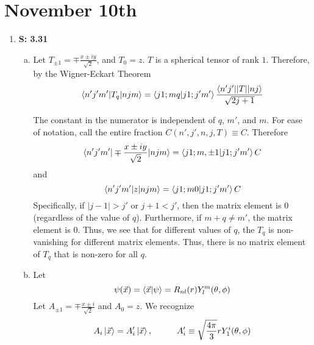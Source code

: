 \documentclass[12pt, letterpaper]{article}
\begin{document}
\section*{November 10th}
\begin{enumerate}
    \item[] \textbf{S: 3.31}
    
    \begin{enumerate}[(a)]
\item 
Let 
$T_{\pm 1}=\mp \frac{x\pm iy}{\sqrt{2}}$, and $T_0=z$. $T$ is a spherical tensor of rank $1$. Therefore, by the Wigner-Eckart Theorem
\begin{equation}
        \braket{n'j'm'|T_q|njm}=\braket{j1;mq|j1;j'm'}\frac{\braket{n'j'||T||nj}}{\sqrt{2j+1}}
\end{equation}

The constant in the numerator is independent of $q$, $m'$, and $m$. For ease of notation, call the entire fraction $C(n',j',n,j,T)\equiv C$.
Therefore
\begin{equation}
        \braket{n'j'm'|\mp\frac{x\pm iy}{\sqrt{2}}|njm}=\braket{j1;m,\pm1|j1;j'm'}C
\end{equation}
and 
\begin{equation}
        \braket{n'j'm'|z|njm}=\braket{j1;m0|j1;j'm'}C
\end{equation}
Specifically, if $|j-1|>j'$ or $j+1<j'$, then the matrix element is $0$ (regardless of the value of $q$). Furthermore, if $m+q\neq m'$, the matrix element is $0$. Thus, we see that for different values of $q$, the $T_q$ is non-vanishing for different matrix elements. Thus, there is no matrix element of $T_q$ that is non-zero for all $q$.


\item Let
\begin{equation}
        \psi(\vec{x})=\braket{\vec{x}|\psi}=R_{nl}(r)Y_l^m(\theta,\phi)
\end{equation}
Let $A_{\pm 1}=\mp \frac{x\pm i}{\sqrt{2}}$ and $A_0=z$. We recognize
\begin{equation}
        A_i\ket{\vec{x}}=A_i'\ket{\vec{x}},\hspace{1cm}A_i'\equiv \sqrt{\frac{4\pi}{3}}rY_1^i (\theta,\phi)
\end{equation}


\end{enumerate}
\end{enumerate}
\end{document}
